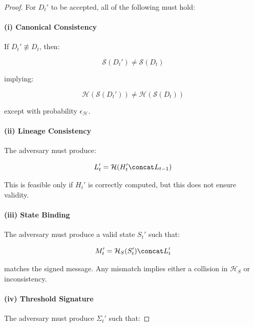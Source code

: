 \begin{proof}
For $D_t'$ to be accepted, all of the following must hold:

\paragraph{(i) Canonical Consistency}

If $D_t' \not\equiv D_t$, then:

\begin{equation}
\mathcal{S}(D_t') \neq \mathcal{S}(D_t)
\end{equation}

implying:

\begin{equation}
\mathcal{H}(\mathcal{S}(D_t')) \neq \mathcal{H}(\mathcal{S}(D_t))
\end{equation}

except with probability $\epsilon_{\mathcal{H}}$.

\paragraph{(ii) Lineage Consistency}

The adversary must produce:

\begin{equation}
L_t' = \mathcal{H}(H_t' \concat L_{t-1})
\end{equation}

This is feasible only if $H_t'$ is correctly computed, but this does not ensure validity.

\paragraph{(iii) State Binding}

The adversary must produce a valid state $S_t'$ such that:

\begin{equation}
M_t' = \mathcal{H}_S(S_t') \concat L_t'
\end{equation}

matches the signed message. Any mismatch implies either a collision in $\mathcal{H}_S$ or inconsistency.

\paragraph{(iv) Threshold Signature}

The adversary must produce $\Sigma_t'$ such that:


\end{proof}

